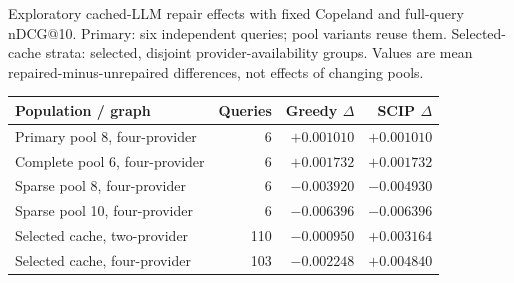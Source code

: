 \begin{supplementtable}
  \caption{Exploratory cached-LLM repair effects with fixed Copeland and
    full-query nDCG@10. Primary: six independent queries; pool variants
    reuse them. Selected-cache strata: selected, disjoint provider-availability
    groups. Values are mean repaired-minus-unrepaired differences, not
    effects of changing pools.}
  \label{tab:corrected-llm}
  \sncstable
  \begin{tabularx}{\linewidth}{@{}Yrrr@{}}
    \toprule
    Population / graph & Queries & Greedy $\Delta$ & SCIP $\Delta$ \\
    \midrule
    Primary pool 8, four-provider & 6 & $+0.001010$ & $+0.001010$ \\
    Complete pool 6, four-provider & 6 & $+0.001732$ & $+0.001732$ \\
    Sparse pool 8, four-provider & 6 & $-0.003920$ & $-0.004930$ \\
    Sparse pool 10, four-provider & 6 & $-0.006396$ & $-0.006396$ \\
    Selected cache, two-provider & 110 & $-0.000950$ & $+0.003164$ \\
    Selected cache, four-provider & 103 & $-0.002248$ & $+0.004840$ \\
    \bottomrule
  \end{tabularx}
\end{supplementtable}